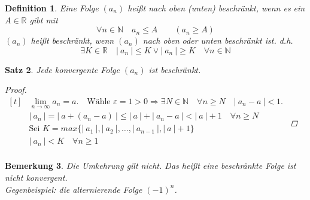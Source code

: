 \documentclass[a4paper,titlepage,oneside]{article}
\def\N{\ensuremath{\mathbb{N}} }
\def\R{\ensuremath{\mathbb{R}} }
\renewcommand{\epsilon}{\ensuremath{\varepsilon} }
\def\lor{\ensuremath{\vee}}
\renewcommand{\liminf}[2][n]{\ensuremath{\lim\limits_{#1 \rightarrow \infty}{#2}}}
\newcommand{\abs}[1]{\ensuremath{\left|\:#1\:\right|}}
\theoremstyle{thmstyle}
\newtheorem{satz}{Satz}[subsection]
\newtheorem{defi}[satz]{Definition}
\newtheorem{bem}[satz]{Bemerkung}
\begin{document}
\begin{defi}
Eine Folge \((a_n)\) heißt nach oben (unten) beschränkt, wenn es ein \(A \in \R\) gibt mit \[\forall n \in \N \quad a_n \le A \qquad (a_n \ge A)\]
\((a_n)\) heißt beschränkt, wenn \((a_n)\) nach oben oder unten beschränkt ist. d.h. \[\exists K \in \R \quad \abs{a_n} \le K \lor \abs{a_n} \ge K \quad \forall n \in \N \]
\end{defi}

\begin{satz}
Jede konvergente Folge \((a_n)\) ist beschränkt.
\begin{proof}
\begin{math} \displaystyle
\begin{aligned}[t]
	&\liminf{a_n} = a. \quad \text{Wähle } \epsilon = 1 > 0 \Rightarrow \exists N \in \N \quad \forall n \ge N \quad \abs{a_n - a} < 1. \\
	&\abs{a_n} = \abs{a + (a_n - a)} \le \abs{a} + \abs{a_n- a} < \abs{a} + 1 \quad \forall n \ge N \\
	&\text{Sei } K = max\{\abs{a_1}, \abs{a_2}, \dots, \abs{a_{n-1}}, \abs{a}+1\} \\
	&\abs{a_n} < K \quad \forall n \ge 1 \\
\end{aligned}
\end{math}
\end{proof}
\end{satz}

\begin{bem}
Die Umkehrung gilt nicht. Das heißt eine beschränkte Folge ist nicht konvergent.\\
\textit{Gegenbeispiel}: die alternierende Folge $(-1)^n$.
\end{bem}
\end{document}
